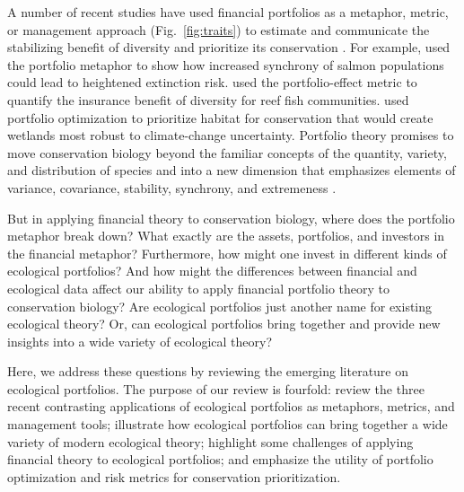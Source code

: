 A number of recent studies have used financial portfolios as a metaphor, metric, or management approach (Fig.~\ref{fig:traits}) to estimate and communicate the stabilizing benefit of diversity and prioritize its conservation \citep[e.g.][]{schindler2010, ando2011, halpern2011, hoekstra2012, anderson2013, mellin2014}. For example, \citet{moore2010} used the portfolio metaphor to show how increased synchrony of salmon populations could lead to heightened extinction risk. \citet{thibaut2012} used the portfolio-effect metric to quantify the insurance benefit of diversity for reef fish communities. \citet{ando2012} used portfolio optimization to prioritize habitat for conservation that would create wetlands most robust to climate-change uncertainty. Portfolio theory promises to move conservation biology beyond the familiar concepts of the quantity, variety, and distribution of species \citep{mace2005} and into a new dimension that emphasizes elements of variance, covariance, stability, synchrony, and extremeness \citep{loreau2010a, thompson2013}.

But in applying financial theory to conservation biology, where does the portfolio metaphor break down? What exactly are the assets, portfolios, and investors in the financial metaphor? Furthermore, how might one invest in different kinds of ecological portfolios? And how might the differences between financial and ecological data affect our ability to apply financial portfolio theory to conservation biology? Are ecological portfolios just another name for existing ecological theory? Or, can ecological portfolios bring together and provide new insights into a wide variety of ecological theory?

Here, we address these questions by reviewing the emerging literature on ecological portfolios. The purpose of our review is fourfold: review the three recent contrasting applications of ecological portfolios as metaphors, metrics, and management tools; illustrate how ecological portfolios can bring together a wide variety of modern ecological theory; highlight some challenges of applying financial theory to ecological portfolios; and emphasize the utility of portfolio optimization and risk metrics for conservation prioritization.



